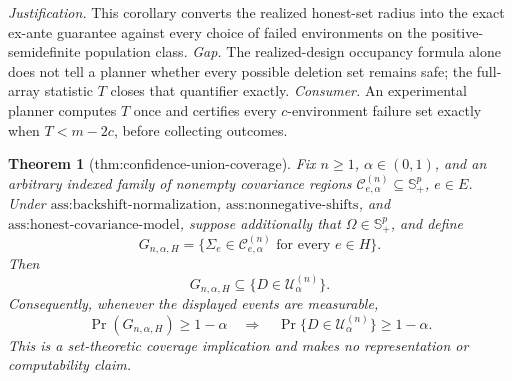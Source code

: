 \documentclass{article}
\newtheorem{theorem}{Theorem}
\begin{document}
\par\smallskip\noindent \textit{Justification.} This corollary converts the realized honest-set radius into the exact ex-ante guarantee against every choice of failed environments on the positive-semidefinite population class. \textit{Gap.} The realized-design occupancy formula alone does not tell a planner whether every possible deletion set remains safe; the full-array statistic \(T\) closes that quantifier exactly. \textit{Consumer.} An experimental planner computes \(T\) once and certifies every \(c\)-environment failure set exactly when \(T<m-2c\), before collecting outcomes.

\begin{theorem}[thm:confidence-union-coverage]\label{thm:confidence-union-coverage}
Fix \(n\geq1\), \(\alpha\in(0,1)\), and an arbitrary indexed family of nonempty covariance regions \(\mathcal C^{(n)}_{e,\alpha}\subseteq\mathbb S_{+}^{p}\), \(e\in E\). Under \(\text{ass:backshift-normalization}\), \(\text{ass:nonnegative-shifts}\), and \(\text{ass:honest-covariance-model}\), suppose additionally that \(\Omega\in\mathbb S_+^p\), and define
\[
G_{n,\alpha,H}
=\{\Sigma_e\in\mathcal C^{(n)}_{e,\alpha}\text{ for every }e\in H\}.
\]
Then
\[
G_{n,\alpha,H}\subseteq\{D\in\mathcal U^{(n)}_\alpha\}.
\]
Consequently, whenever the displayed events are measurable,
\[
\Pr(G_{n,\alpha,H})\geq1-\alpha
\quad\Longrightarrow\quad
\Pr\{D\in\mathcal U^{(n)}_\alpha\}\geq1-\alpha.
\]
This is a set-theoretic coverage implication and makes no representation or computability claim.
\end{theorem}
\end{document}
